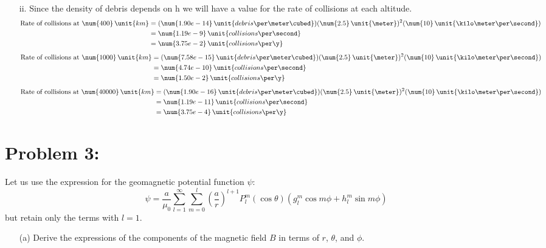 \documentclass{article}
\begin{document}
{\begin{enumerate}
\begin{enumerate}
			\item[ii.] Since the density of debris depends on h we will have a value for the rate of collisions at each altitude.
			\begin{equation*}
				\begin{split}
					\text{Rate of collisions at } \num{400} \, \unit{km} &= (\num{1.90e-14} \, \unit{debris \per\meter\cubed}) (\num{2.5} \, \unit{\meter})^2 (\num{10} \, \unit{\kilo\meter\per\second}) \\
					&= \num{1.19e-9} \, \unit{collisions \per \second} \\
					&= \num{3.75e-2} \, \unit{collisions \per \y}	
				\end{split}
			\end{equation*}
			\begin{equation*}
				\begin{split}
					\text{Rate of collisions at } \num{1000} \, \unit{km} &= (\num{7.58e-15} \, \unit{debris \per\meter\cubed}) (\num{2.5} \, \unit{\meter})^2 (\num{10} \, \unit{\kilo\meter\per\second}) \\
					&= \num{4.74e-10} \, \unit{collisions \per \second} \\
					&= \num{1.50e-2} \, \unit{collisions \per \y}
				\end{split}
			\end{equation*}
			\begin{equation*}
				\begin{split}
					\text{Rate of collisions at } \num{40000} \, \unit{km} &= (\num{1.90e-16} \, \unit{debris \per\meter\cubed}) (\num{2.5} \, \unit{\meter})^2 (\num{10} \, \unit{\kilo\meter\per\second}) \\
					&= \num{1.19e-11} \, \unit{collisions \per \second} \\
					&= \num{3.75e-4} \, \unit{collisions \per \y}
				\end{split}
			\end{equation*}
		\end{enumerate}
		
	\end{enumerate}
	\clearpage
	\section*{Problem 3: }
	\boldmath
	Let us use the expression for the geomagnetic potential function $\psi$:
	\[
		\psi = \frac{a}{\mu_0} \sum_{l=1}^{\infty} \sum_{m=0}^{l} \left( \frac{a}{r} \right)^{l+1} P^m_l (\cos \theta) (g^m_l \cos m\phi + h^m_l \sin m\phi)
	\]
	but retain only the terms with $l=1$. \\
	\begin{enumerate}
		\item[(a)] Derive the expressions of the components of the magnetic field $B$ in terms of $r$, $\theta$, and $\phi$.

\end{enumerate}}
\end{document}
